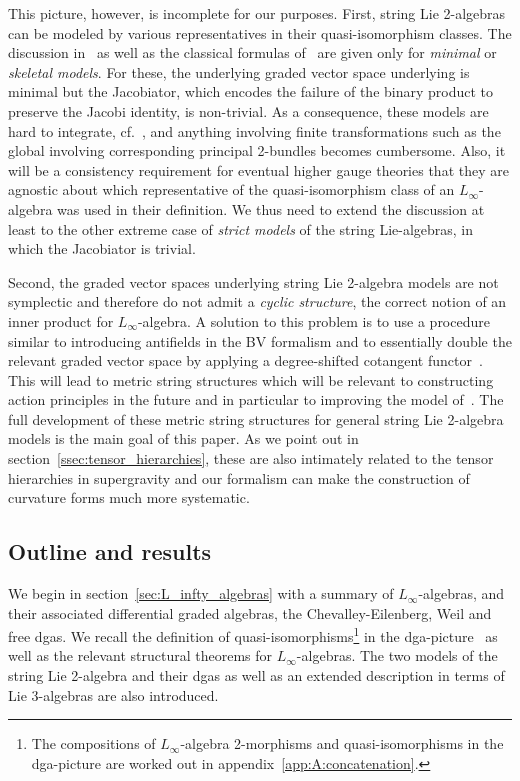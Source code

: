 \documentclass[reqno,a4paper,11pt]{article}
\let\fn\footnote
\renewcommand{\footnote}[1]{\linespread{1.1}\fn{#1}\linespread{1.29}}
\begin{document}
This picture, however, is incomplete for our purposes. First, string Lie 2-algebras can be modeled by various representatives in their quasi-isomorphism classes. The discussion in~\cite{Sati:2008eg} as well as the classical formulas of~\cite{Bergshoeff:1981um,Chapline:1982ww} are given only for {\em minimal} or {\em skeletal models}. For these, the underlying graded vector space underlying is minimal but the Jacobiator, which encodes the failure of the binary product to preserve the Jacobi identity, is non-trivial. As a consequence, these models are hard to integrate, cf.~\cite{Schommer-Pries:0911.2483}, and anything involving finite transformations such as the global involving corresponding principal 2-bundles becomes cumbersome. Also, it will be a consistency requirement for eventual higher gauge theories that they are agnostic about which representative of the quasi-isomorphism class of an $L_\infty$-algebra was used in their definition. We thus need to extend the discussion at least to the other extreme case of {\em strict models} of the string Lie-algebras, in which the Jacobiator is trivial. 

Second, the graded vector spaces underlying string Lie 2-algebra models are not symplectic and therefore do not admit a {\em cyclic structure}, the correct notion of an inner product for $L_\infty$-algebra. A solution to this problem is to use a procedure similar to introducing antifields in the BV formalism and to essentially double the relevant graded vector space by applying a degree-shifted cotangent functor~\cite{Saemann:2017zpd,Saemann:2017rjm}. This will lead to metric string structures which will be relevant to constructing action principles in the future and in particular to improving the model of~\cite{Saemann:2017zpd}. The full development of these metric string structures for general string Lie 2-algebra models is the main goal of this paper. As we point out in section~\ref{ssec:tensor_hierarchies}, these are also intimately related to the tensor hierarchies in supergravity and our formalism can make the construction of curvature forms much more systematic.

\subsection{Outline and results}

We begin in section~\ref{sec:L_infty_algebras} with a summary of $L_\infty$-algebras, and their associated differential graded algebras, the Chevalley-Eilenberg, Weil and free dgas. We recall the definition of quasi-isomorphisms\footnote{The compositions of $L_\infty$-algebra 2-morphisms and quasi-isomorphisms in the dga-picture are worked out in appendix~\ref{app:A:concatenation}.} in the dga-picture~\cite{Sati:2008eg} as well as the relevant structural theorems for $L_\infty$-algebras. The two models of the string Lie 2-algebra and their dgas as well as an extended description in terms of Lie 3-algebras are also introduced. 
\end{document}
